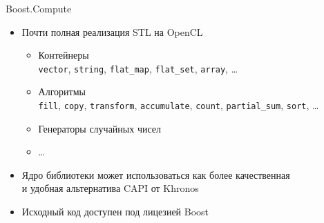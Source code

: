 \documentclass[@BEAMER_OPTIONS@]{beamer}
\newcommand{\code}[1]{\lstinline|#1|}
\newcommand{\CXX}{{\rm C}\plusplus}
\begin{document}
\begin{frame}[fragile]{Boost.Compute}
    \begin{itemize}
        \item Почти полная реализация STL на OpenCL
            \begin{itemize}
                \item Контейнеры\\
                    \code{vector}, \code{string}, \code{flat_map},
                    \code{flat_set}, \code{array}, \ldots
                \item Алгоритмы\\
                    \code{fill}, \code{copy}, \code{transform},
                    \code{accumulate}, \code{count}, \code{partial_sum},
                    \code{sort}, \ldots
                \item Генераторы случайных чисел
                \item \ldots
            \end{itemize}
        \item Ядро библиотеки может использоваться как более качественная\\
            и удобная альтернатива \CXX API от Khronos
        \item Исходный код доступен под лицезией Boost
    \end{itemize}
\end{frame}
\end{document}
